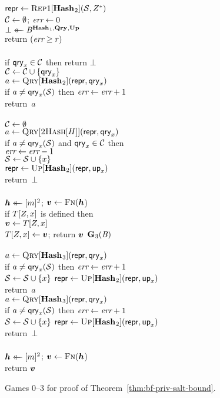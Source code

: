 \begin{figure}
{      $\mathsf{repr} \gets \textsc{Rep}1[\mathbf{Hash}\hspace{0.5pt}_2](\mathcal{S}, Z^*)$\\
      $\mathcal{C} \gets \emptyset$;
      $\textit{err} \gets 0$\\
      $\bot \mathrel{\leftarrow\mkern-14mu\leftarrow} \mathit{B}^{\mathbf{Hash}\hspace{0.5pt}_1,\mathbf{Qry}\hspace{0.5pt},\mathbf{Up}\hspace{0.5pt}}$\\
      return $(\textit{err} \geq r)$
    \\[6pt]
    \\[2pt]
      if $\mathsf{qry}_x \in \mathcal{C}$ then return $\bot$\\
      $\mathcal{C} \gets \mathcal{C} \cup \{\mathsf{qry}_x\}$\\
      $a \gets \textsc{Qry}[\mathbf{Hash}\hspace{0.5pt}_2](\mathsf{repr}, \mathsf{qry}_x)$\\
      if $a \neq \mathsf{qry}_x(\mathcal{S})$ then $\textit{err} \gets \textit{err} + 1$\\
      return~$a$
    \\[6pt]
    \\[2pt]
      $\mathcal{C} \gets \emptyset$\\
      $a \gets \textsc{Qry}[\textsc{2Hash}[H]](\mathsf{repr}, \mathsf{qry}_x)$\\
      if $a \neq \mathsf{qry}_x(\mathcal{S})$ and $\mathsf{qry}_x \in \mathcal{C}$ then\\
      \tab $\textit{err} \gets \textit{err}-1$\\
      $\mathcal{S} \gets \mathcal{S} \cup \{x\}$\\
      $\mathsf{repr} \gets \textsc{Up}[\mathbf{Hash}\hspace{0.5pt}_2](\mathsf{repr},\mathsf{up}_x)$\\
      return~$\bot$
    \\[6pt]
    \\[2pt]
      $\hh \getsr [m]^2$; $\vv \gets \fff(\hh$)\\
      if $T[Z,x]$ is defined then\\
      \tab $\vv \gets T[\salt,x]$\\
      $T[\salt,x] \gets \vv$;
      return $\vv$
  }
  {
    \underline{$\mathbf{G}\hspace{0.5pt}_3(\mathit{B})$}\\[2pt]
    \\[2pt]
      $a \gets \textsc{Qry}[\mathbf{Hash}\hspace{0.5pt}_3](\mathsf{repr}, \mathsf{qry}_x)$\\
      if $a \neq \mathsf{qry}_x(\mathcal{S})$ then $\textit{err} \gets \textit{err} + 1$\\
      $\mathcal{S} \gets \mathcal{S} \cup \{x\}$
      $\mathsf{repr} \gets \textsc{Up}[\mathbf{Hash}\hspace{0.5pt}_2](\mathsf{repr},\mathsf{up}_x)$\\
      return~$a$
  }
  {
    \\[2pt]
      $a \gets \textsc{Qry}[\mathbf{Hash}\hspace{0.5pt}_3](\mathsf{repr}, \mathsf{qry}_x)$\\
      if $a \neq \mathsf{qry}_x(\mathcal{S})$ then $\textit{err} \gets \textit{err} + 1$\\
      $\mathcal{S} \gets \mathcal{S} \cup \{x\}$
      $\mathsf{repr} \gets \textsc{Up}[\mathbf{Hash}\hspace{0.5pt}_2](\mathsf{repr},\mathsf{up}_x)$\\
      return~$\bot$
    \\[6pt]
    \\[2pt]
      $\hh \getsr [m]^2$; $\vv \gets \fff(\hh$)\\
      return $\vv$
  }
  \caption{Games 0--3 for proof of Theorem~\ref{thm:bf-priv-salt-bound}.}
  \label{fig:bf-priv-salt-bound}
\end{figure}

